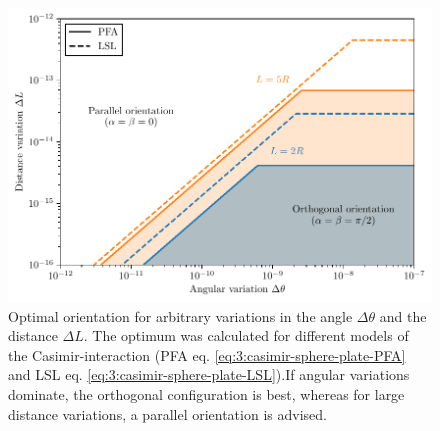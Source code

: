 \begin{figure}[!htbp]
  \centering
  \includegraphics[width=\textwidth]{./../figures/optimize/optimized-orientation.pdf}
  \caption{Optimal orientation for arbitrary variations in the angle $\Delta\theta$ and the distance $\Delta L$. The optimum was calculated for different models of the Casimir-interaction (PFA eq. \eqref{eq:3:casimir-sphere-plate-PFA} and LSL eq. \eqref{eq:3:casimir-sphere-plate-LSL}).If angular variations dominate, the orthogonal configuration is best, whereas for large distance variations, a parallel orientation is advised.}
  \label{fig:4:optimal-orientation}
\end{figure}